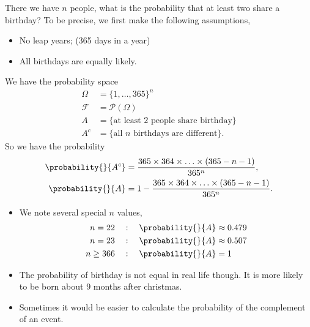 \begin{example}
    There we have \(n\) people, what is the probability that at least two share a birthday? To be precise, we first make the following assumptions,
    \begin{itemize}
        \item No leap years; (365 days in a year)
        \item All birthdays are equally likely.
    \end{itemize}
    We have the probability space
    \begin{align*}
        \Omega &= \{1, \ldots, 365 \}^n\\
        \mathcal{F} &= \mathcal{P} (\Omega)\\
        A &= \{\text{at least 2 people share birthday}\}\\
        A^c &= \{\text{all \(n\) birthdays are different}\}.
    \end{align*}
    So we have the probability
    \begin{align*}
        \probability{}{A^c} &= \frac{365\times 364\times \ldots \times (365-n-1)}{365^n},\\
        \probability{}{A} &= 1 - \frac{365\times 364\times \ldots \times (365-n-1)}{365^n}.
    \end{align*}
    \begin{remark}
        \leavevmode
        \begin{itemize}
        \item We note several special \(n\) values,
        \begin{align*}
            n=22\quad&:\quad \probability{}{A} \approx 0.479\\
            n=23\quad&:\quad \probability{}{A} \approx 0.507\\
            n\geq 366\quad&:\quad \probability{}{A} = 1
        \end{align*}
        \item The probability of birthday is not equal in real life though. It is more likely to be born about 9 months after christmas.
        \item Sometimes it would be easier to calculate the probability of the complement of an event.
        \end{itemize}
    \end{remark}
\end{example}

